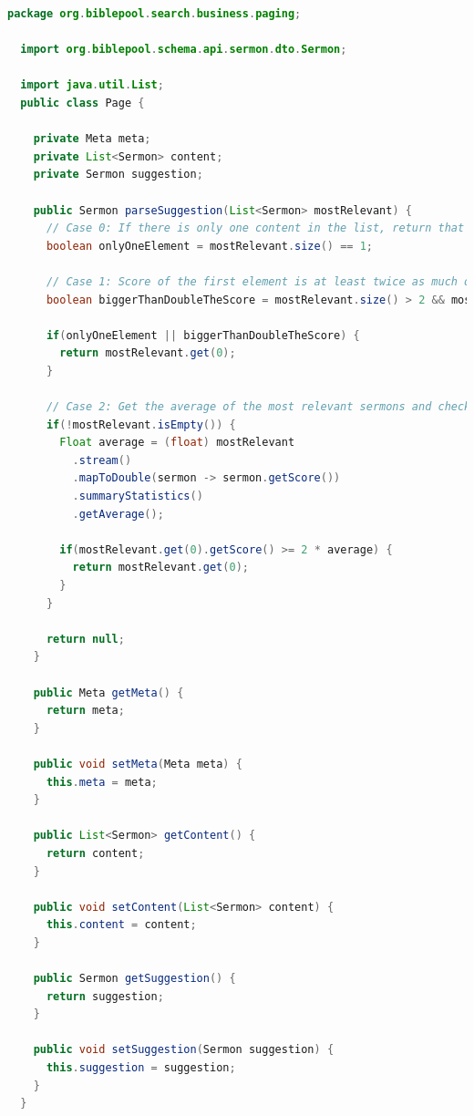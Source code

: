 \clearpage

\begin{lstlisting}[language=Java, label=code:SolrResponse, title={Vorschlag in der zurückgegebenen Antwort \cite{solr-search2022}}]
  package org.biblepool.search.business.paging;

  import org.biblepool.schema.api.sermon.dto.Sermon;

  import java.util.List;
  public class Page {

    private Meta meta;
    private List<Sermon> content;
    private Sermon suggestion;

    public Sermon parseSuggestion(List<Sermon> mostRelevant) {
      // Case 0: If there is only one content in the list, return that as suggestion
      boolean onlyOneElement = mostRelevant.size() == 1;

      // Case 1: Score of the first element is at least twice as much of the second score
      boolean biggerThanDoubleTheScore = mostRelevant.size() > 2 && mostRelevant.get(0).getScore() >= 2 * mostRelevant.get(1).getScore();

      if(onlyOneElement || biggerThanDoubleTheScore) {
        return mostRelevant.get(0);
      }

      // Case 2: Get the average of the most relevant sermons and check if the first has at least twice as much of that
      if(!mostRelevant.isEmpty()) {
        Float average = (float) mostRelevant
          .stream()
          .mapToDouble(sermon -> sermon.getScore())
          .summaryStatistics()
          .getAverage();

        if(mostRelevant.get(0).getScore() >= 2 * average) {
          return mostRelevant.get(0);
        }
      }

      return null;
    }

    public Meta getMeta() {
      return meta;
    }

    public void setMeta(Meta meta) {
      this.meta = meta;
    }

    public List<Sermon> getContent() {
      return content;
    }

    public void setContent(List<Sermon> content) {
      this.content = content;
    }

    public Sermon getSuggestion() {
      return suggestion;
    }

    public void setSuggestion(Sermon suggestion) {
      this.suggestion = suggestion;
    }
  }
\end{lstlisting}


